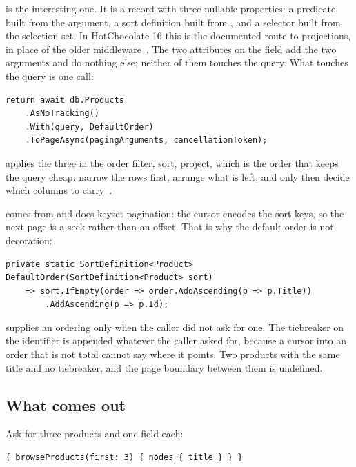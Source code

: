 %
 is the interesting one. It is a record with three
nullable properties: a predicate built from the  argument, a sort
definition built from , and a selector built from the selection set.
In HotChocolate 16 this is the documented route to projections, in place of the
older \code{[UseProjection]} middleware~\autocite{chillicream2026projections}.
The two attributes on the field add the two arguments and do nothing else;
neither of them touches the query. What touches the query is one call:

\begin{verbatim}
return await db.Products
    .AsNoTracking()
    .With(query, DefaultOrder)
    .ToPageAsync(pagingArguments, cancellationToken);
\end{verbatim}

 applies the three in the order filter, sort, project, which is the
order that keeps the query cheap: narrow the rows first, arrange what is left,
and only then decide which columns to carry~\autocite{chillicream2026projections}.

%
 comes from  and does
keyset pagination: the cursor encodes the sort keys, so the next page is a seek
rather than an offset. That is why the default order is not decoration:

\begin{verbatim}
private static SortDefinition<Product> DefaultOrder(SortDefinition<Product> sort)
    => sort.IfEmpty(order => order.AddAscending(p => p.Title))
        .AddAscending(p => p.Id);
\end{verbatim}

 supplies an ordering only when the caller did not ask for one. The
tiebreaker on the identifier is appended whatever the caller asked for, because
a cursor into an order that is not total cannot say where it points. Two
products with the same title and no tiebreaker, and the page boundary between
them is undefined.

\subsection*{What comes out}

%
Ask for three products and one field each:

\begin{verbatim}
{ browseProducts(first: 3) { nodes { title } } }
\end{verbatim}

